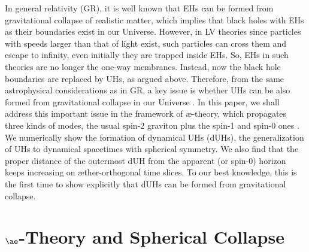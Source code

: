 \documentclass[aps,preprintnumbers,twocolumn,showpacs]{revtex4-1}
\begin{document}
 In general relativity (GR), it is well known that EHs can be formed from gravitational collapse of realistic matter, which implies that black holes with EHs as their boundaries exist in our Universe. However, in LV theories since particles with speeds larger than that of light exist, such particles can cross them and escape  to infinity,  even initially they are trapped inside  EHs. So, EHs in such theories are no longer the one-way membranes.  Instead, now the black hole boundaries are replaced by UHs, as  argued above. Therefore, from the same astrophysical considerations as in GR, a key issue  is whether UHs can be also formed from gravitational collapse in our Universe    \cite{SAM14,TWSW15,BCCS16}. In this paper, we shall address this important  issue in the framework of $\mbox{\ae}$-theory, which propagates three kinds of modes, the usual spin-2 graviton plus the spin-1 and spin-0 ones \cite{Jacobson}. We numerically show the formation of dynamical UHs (dUHs), the generalization of UHs to dynamical spacetimes with spherical symmetry. We also find that the proper distance of the outermost dUH from the apparent (or spin-0) horizon keeps increasing on $\mbox{\ae}$ther-orthogonal time slices. To our best knowledge, this is the first time  to show explicitly that dUHs can be formed from gravitational collapse. 
 

\section{${\ae}$-Theory and Spherical Collapse}
\end{document}

